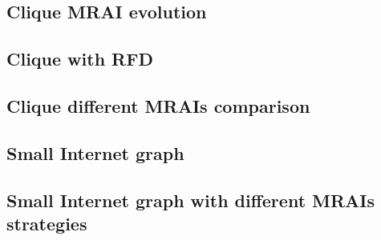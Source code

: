 \documentclass[10pt,journal,onecolumn]{IEEEtran}
\begin{document}
\subsection{Clique MRAI evolution}
\label{subsec:clique_evolution}

\subsection{Clique with RFD}
\label{subsec:clique_rfd}

\subsection{Clique different MRAIs comparison}
\label{subsec:clique_different_mrais}

\subsection{Small Internet graph}
\label{subsec:small_internet_graph}

\subsection{Small Internet graph with different MRAIs strategies}
\label{subsec:small_internet_graph_multiple_MRAIs}

\printindex


\end{document}
